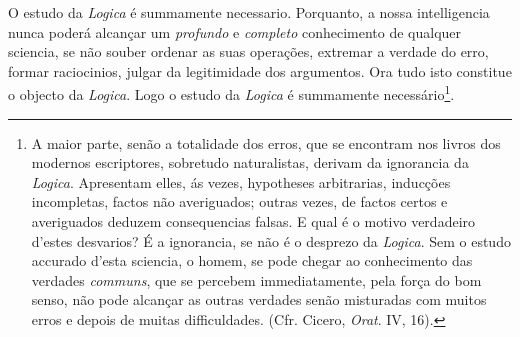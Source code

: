   
O estudo da \emph{Logica} é summamente necessario. Porquanto, a nossa intelligencia nunca poderá alcançar um \emph{profundo} e \emph{completo} conhecimento de qualquer sciencia, se não souber ordenar as suas operações, extremar a verdade do erro, formar raciocinios, julgar da legitimidade dos argumentos. Ora tudo isto constitue o objecto da \emph{Logica}. Logo o estudo da \emph{Logica} é summamente necessário\footnote{A maior parte, senão a totalidade dos erros, que se encontram nos livros dos modernos escriptores, sobretudo naturalistas, derivam da ignorancia da \emph{Logica}. Apresentam elles, ás vezes, hypotheses arbitrarias, inducções incompletas, factos não averiguados; outras vezes, de factos certos e averiguados deduzem consequencias falsas. E qual é o motivo verdadeiro d'estes desvarios? É a ignorancia, se não é o desprezo da \emph{Logica}. Sem o estudo accurado d'esta sciencia, o homem, se pode chegar ao conhecimento das verdades \emph{communs}, que se percebem immediatamente, pela força do bom senso, não pode alcançar as outras verdades senão misturadas com muitos erros e depois de muitas difficuldades. (Cfr. Cicero, \emph{Orat}. IV, 16).}.


